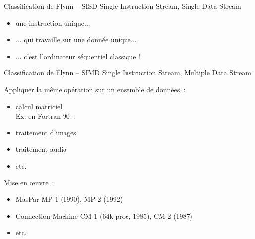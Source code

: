 \begin {frame} {Classification de Flynn -- SISD}
    Single Instruction Stream, Single Data Stream

    \begin {itemize}
	\item une instruction unique...
	\item ... qui travaille sur une donnée unique...
	\item ... c'est l'ordinateur séquentiel classique !
    \end {itemize}
\end {frame}

\begin {frame} {Classification de Flynn -- SIMD}
    Single Instruction Stream, Multiple Data Stream

    \vspace* {3mm}

    Appliquer la même opération sur un ensemble de données~:
    \begin {itemize}
	\item calcul matriciel \\
	    Ex: en Fortran 90~: 
	\item traitement d'images
	\item traitement audio
	\item etc.
    \end {itemize}

    \vspace* {2mm}

    Mise en {\oe}uvre~:
    \begin {itemize}
	\item MasPar MP-1 (1990), MP-2 (1992)
	\item Connection Machine CM-1 (64k proc, 1985), CM-2 (1987)
	\item etc.
    \end {itemize}

\end {frame}


